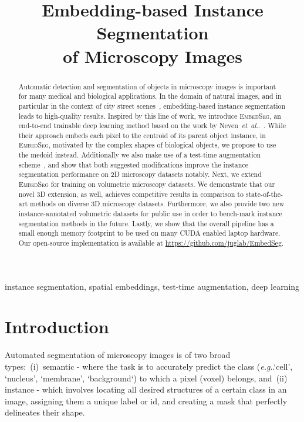 \documentclass{midl} %
\title[Embedding-based Instance Segmentation of Microscopy Images]{Embedding-based Instance Segmentation \\of Microscopy Images}
\makeatletter
\newcommand{\EmbedSeg}{\mbox{\textsc{EmbedSeg}}\xspace}
\DeclareRobustCommand\onedot{\futurelet\@let@token\@onedot}
\def\@onedot{\ifx\@let@token.\else.\null\fi\xspace}
\def\eg{\emph{e.g}\onedot} \def\Eg{\emph{E.g}\onedot}
\def\etal{\emph{et~al}\onedot}
\makeatother
\begin{document}
\maketitle

\begin{abstract}
Automatic detection and segmentation of objects in microscopy images is important for many medical and biological applications.
In the domain of natural images, and in particular in the context of city street scenes~\cite{Cordts2016Cityscapes}, embedding-based instance segmentation leads to high-quality results.
Inspired by this line of work, we introduce \EmbedSeg, an end-to-end trainable deep learning method based on the work by Neven~\etal~\cite{neven2019}. 
While their approach embeds each pixel to the centroid of its parent object instance, in \EmbedSeg, motivated by the complex shapes of biological objects, we propose to use the medoid instead.
Additionally we also make use of a test-time augmentation scheme~\cite{wang2019}, and show that both suggested modifications improve the instance segmentation performance on 2D microscopy datasets notably.
Next, we extend \EmbedSeg for training on volumetric microscopy datasets. 
We demonstrate that our novel 3D extension, as well, achieves competitive results in comparison to state-of-the-art methods on diverse 3D microscopy datasets.
Furthermore, we also provide two new instance-annotated volumetric datasets for public use in order to bench-mark instance segmentation methods in the future.
Lastly, we show that the overall pipeline has a small enough memory footprint to be used on many CUDA enabled laptop hardware.
Our open-source implementation is available at \url{https://github.com/juglab/EmbedSeg}.
\end{abstract}

\begin{keywords}
instance segmentation, spatial embeddings, test-time augmentation, deep learning
\end{keywords}

\section{Introduction}

Automated segmentation of microscopy images is of two broad types:~(i)~semantic - where the task is to accurately predict the class (\eg `cell', `nucleus', `membrane', `background`) to which a pixel (voxel) belongs, and~(ii) instance - which involves locating all desired structures of a certain class  in an image, assigning them a unique label or id, and creating a mask that perfectly delineates their shape.
\end{document}
